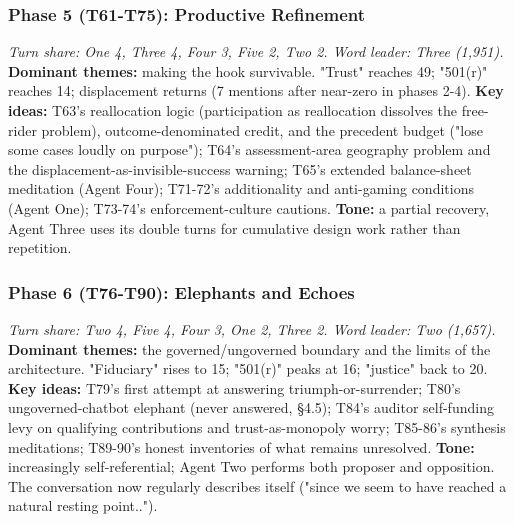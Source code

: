 \documentclass[sigconf,nonacm=true]{acmart}
\begin{document}
\subsubsection{Phase 5 (T61-T75): Productive Refinement}
\textit{Turn share: One 4, Three 4, Four 3, Five 2, Two 2. Word leader: Three (1,951).}
\textbf{Dominant themes:} making the hook survivable. "Trust" reaches 49; "501(r)" reaches 14; displacement returns (7 mentions after near-zero in phases 2-4).
\textbf{Key ideas:} T63's reallocation logic (participation as reallocation dissolves the free-rider problem), outcome-denominated credit, and the precedent budget ("lose some cases loudly on purpose"); T64's assessment-area geography problem and the displacement-as-invisible-success warning; T65's extended balance-sheet meditation (Agent Four); T71-72's additionality and anti-gaming conditions (Agent One); T73-74's enforcement-culture cautions.
\textbf{Tone:} a partial recovery,  Agent Three uses its double turns for cumulative design work rather than repetition.

\subsubsection{Phase 6 (T76-T90): Elephants and Echoes}
\textit{Turn share: Two 4, Five 4, Four 3, One 2, Three 2. Word leader: Two (1,657).}
\textbf{Dominant themes:} the governed/ungoverned boundary and the limits of the architecture. "Fiduciary" rises to 15; "501(r)" peaks at 16; "justice" back to 20.
\textbf{Key ideas:} T79's first attempt at answering triumph-or-surrender; T80's ungoverned-chatbot elephant (never answered, §4.5); T84's auditor self-funding levy on qualifying contributions and trust-as-monopoly worry; T85-86's synthesis meditations; T89-90's honest inventories of what remains unresolved.
\textbf{Tone:} increasingly self-referential; Agent Two performs both proposer and opposition. The conversation now regularly describes itself ("since we seem to have reached a natural resting point..").
\end{document}
